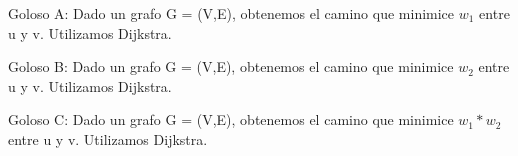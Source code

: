 
Goloso A:
Dado un grafo G = (V,E), obtenemos el camino que minimice $w_1$ entre u y v. Utilizamos Dijkstra.

Goloso B:
Dado un grafo G = (V,E), obtenemos el camino que minimice $w_2$ entre u y v. Utilizamos Dijkstra.

Goloso C:
Dado un grafo G = (V,E), obtenemos el camino que minimice $w_1 * w_2$ entre u y v. Utilizamos Dijkstra.